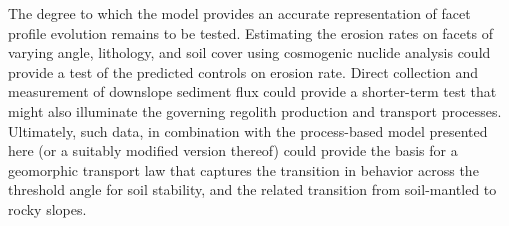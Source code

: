 The degree to which the model provides an accurate representation of facet profile evolution remains to be tested. Estimating the erosion rates on facets of varying angle, lithology, and soil cover using cosmogenic nuclide analysis could provide a test of the predicted controls on erosion rate. Direct collection and measurement of downslope sediment flux could provide a shorter-term test that might also illuminate the governing regolith production and transport processes. Ultimately, such data, in combination with the process-based model presented here (or a suitably modified version thereof) could provide the basis for a geomorphic transport law that captures the transition in behavior across the threshold angle for soil stability, and the related transition from soil-mantled to rocky slopes.









